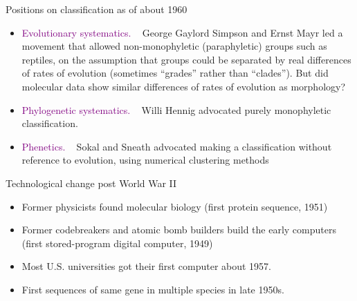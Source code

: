 \documentclass[pdf,bluish,slideColor,colorBG]{prosper}
\begin{document}
\begin{slide}[Replace]{Positions on classification as of about 1960}

\begin{itemize}
\item \textcolor{purple}{Evolutionary systematics.} ~ George Gaylord Simpson and Ernst Mayr
led a movement that allowed non-monophyletic (paraphyletic) groups such
as reptiles, on the assumption that groups could be separated by real
differences of rates of evolution (sometimes ``grades'' rather than ``clades''). 
But did molecular data show similar differences of rates of evolution as
morphology?
\item \textcolor{purple}{Phylogenetic systematics.} ~ Willi Hennig advocated purely monophyletic
classification.
\item \textcolor{purple}{Phenetics.} ~ Sokal and Sneath advocated making a classification without
reference to evolution, using numerical clustering methods
\end{itemize}

\end{slide}

\begin{slide}[Replace]{Technological change post World War II}
\bigskip

\begin{itemize}
\item Former physicists found molecular biology (first protein sequence, 1951)
\item Former codebreakers and atomic bomb builders build the early
computers (first stored-program digital computer, 1949)
\item Most U.S. universities got their first computer about 1957.
\item First sequences of same gene in multiple species in late 1950s.
\end{itemize}



\end{slide}
\end{document}
